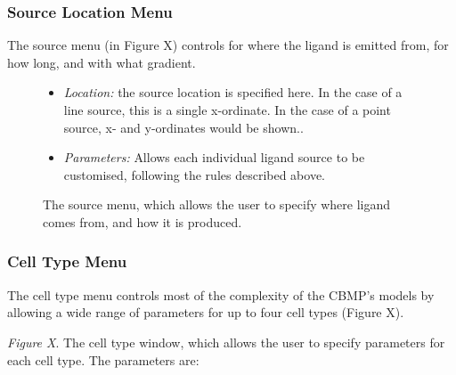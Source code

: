 \documentclass[12pt]{article}
\begin{document}


\subsubsection{Source Location Menu}
The source menu (in Figure X) controls for where the ligand is emitted 
from, for how long, and with what gradient.

\begin{figure}[H]
\centering
\caption[]{The source menu, which allows the user to specify 
where ligand comes from, and how it is produced.}
\begin{itemize}
\item {\itshape Location: }the source location is specified here. In the 
case of a line source, this is a single x-ordinate. In the case of a 
point source, x- and y-ordinates would be shown..
\item {\itshape Parameters: }Allows each individual ligand source to be 
customised, following the rules described above.
\end{itemize}
\end{figure}

\subsubsection{Cell Type Menu}
The cell type menu controls most of the complexity of the CBMP's models 
by allowing a wide range of parameters for up to four cell types (Figure 
X). 

\begin{figure}[H]
\centering
\end{figure}


{\itshape Figure X}. The cell type window, which allows the user to 
specify parameters for each cell type. The parameters are:
\end{document}

